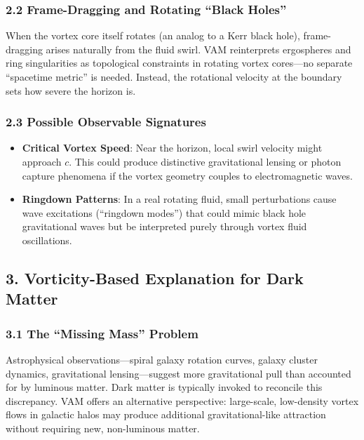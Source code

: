 \documentclass[aps,preprint,superscriptaddress]{revtex4-2}
\begin{document}
    \subsubsection*{2.2 Frame-Dragging and Rotating “Black Holes”}
    When the vortex core itself rotates (an analog to a Kerr black hole), frame-dragging arises naturally from the fluid swirl. VAM reinterprets ergospheres and ring singularities as topological constraints in rotating vortex cores—no separate “spacetime metric” is needed. Instead, the rotational velocity at the boundary sets how severe the horizon is.

    \subsubsection*{2.3 Possible Observable Signatures}
    \begin{itemize}
        \item \textbf{Critical Vortex Speed}: Near the horizon, local swirl velocity might approach \(c\). This could produce distinctive gravitational lensing or photon capture phenomena if the vortex geometry couples to electromagnetic waves.
        \item \textbf{Ringdown Patterns}: In a real rotating fluid, small perturbations cause wave excitations (“ringdown modes”) that could mimic black hole gravitational waves but be interpreted purely through vortex fluid oscillations.
    \end{itemize}

    \subsection*{3. Vorticity-Based Explanation for Dark Matter}

    \subsubsection*{3.1 The “Missing Mass” Problem}
    Astrophysical observations—spiral galaxy rotation curves, galaxy cluster dynamics, gravitational lensing—suggest more gravitational pull than accounted for by luminous matter. Dark matter is typically invoked to reconcile this discrepancy. VAM offers an alternative perspective: large-scale, low-density vortex flows in galactic halos may produce additional gravitational-like attraction without requiring new, non-luminous matter.
\end{document}
